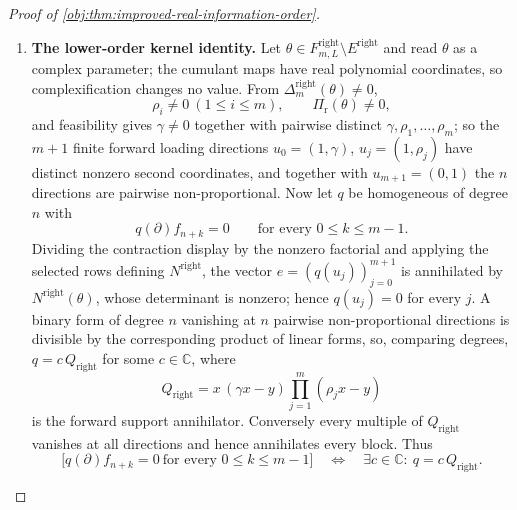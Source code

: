 \documentclass[11pt]{article}
\begin{document}
\begin{proof}[Proof of \cref{obj:thm:improved-real-information-order}]
\begin{enumerate}
\item \textbf{The lower-order kernel identity.}  Let \(\theta\in F^{\mathrm{right}}_{m,L}\setminus E^{\mathrm{right}}\) and read \(\theta\) as a complex parameter; the cumulant maps have real polynomial coordinates, so complexification changes no value.  From \(\Delta^{\mathrm{right}}_m(\theta)\ne0\),
\[
\rho_i\ne0\ (1\le i\le m),
\qquad
\Pi_{\mathrm r}(\theta)\ne0 ,
\]
and feasibility gives \(\gamma\ne0\) together with pairwise distinct \(\gamma,\rho_1,\ldots,\rho_m\); so the \(m+1\) finite forward loading directions \(u_0=(1,\gamma)\), \(u_j=(1,\rho_j)\) have distinct nonzero second coordinates, and together with \(u_{m+1}=(0,1)\) the \(n\) directions are pairwise non-proportional.  Now let \(q\) be homogeneous of degree \(n\) with
\[
q(\partial)f_{n+k}=0
\qquad\text{for every }0\le k\le m-1 .
\]
Dividing the contraction display by the nonzero factorial and applying the selected rows defining \(N^{\mathrm{right}}\), the vector \(e=(q(u_j))_{j=0}^{m+1}\) is annihilated by \(N^{\mathrm{right}}(\theta)\), whose determinant is nonzero; hence \(q(u_j)=0\) for every \(j\).  A binary form of degree \(n\) vanishing at \(n\) pairwise non-proportional directions is divisible by the corresponding product of linear forms, so, comparing degrees, \(q=c\,Q_{\mathrm{right}}\) for some \(c\in\mathbb C\), where
\[
Q_{\mathrm{right}}=x\,(\gamma x-y)\prod_{j=1}^{m}(\rho_jx-y)
\]
is the forward support annihilator.  Conversely every multiple of \(Q_{\mathrm{right}}\) vanishes at all directions and hence annihilates every block.  Thus
\[
\bigl[q(\partial)f_{n+k}=0\ \text{for every }0\le k\le m-1\bigr]
\quad\Longleftrightarrow\quad
\exists c\in\mathbb C:\ q=c\,Q_{\mathrm{right}} .
\]


\end{enumerate}
\end{proof}
\end{document}
